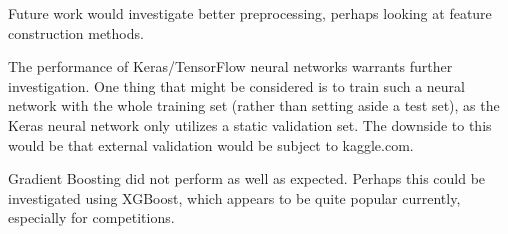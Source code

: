 \documentclass[a4paper]{article}
\begin{document}
Future work would investigate better preprocessing, perhaps looking at feature construction methods.

The performance of Keras/TensorFlow neural networks warrants further investigation.  One thing that might be considered is to train such a neural network with the whole training set (rather than setting aside a test set), as the Keras neural network only utilizes a static validation set.  The downside to this would be that external validation would be subject to kaggle.com.

Gradient Boosting did not perform as well as expected.  Perhaps this could be investigated using XGBoost, which appears to be quite popular currently, especially for competitions.



\appendix
\setlength{\voffset}{0cm}
\setlength{\hoffset}{0cm}



\setlength{\voffset}{-2.54cm}
\setlength{\hoffset}{-2.54cm}

\end{document}
